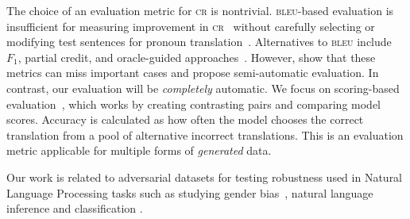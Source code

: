 The choice of an evaluation metric for \textsc{cr} is nontrivial. 
%
\textsc{bleu}-based evaluation is insufficient for measuring improvement in \textsc{cr}~\citep{hardmeier2012discourse} 
without carefully selecting or modifying test sentences for pronoun translation~\citep{voita2018anaphora,stojanovski-fraser-2018-coreference}.
%
Alternatives to \textsc{bleu} include $F_1$, partial credit, and oracle-guided approaches~\citep{hardmeier2010modelling,guillou-hardmeier-2016-protest,miculicich-werlen-popescu-belis-2017-validation}. 
%
However, \citet{guillou-hardmeier-2018-automatic} show that these metrics can miss important cases and propose semi-automatic evaluation. 
%
In contrast, our evaluation will be \textit{completely} automatic.  
%
We focus on scoring-based evaluation~\citep{sennrich-2017-grammatical}, which works by creating contrasting pairs and comparing model scores. 
%
Accuracy is calculated as how often the model chooses the correct translation from a pool of alternative incorrect translations.
%
This is an evaluation metric applicable for multiple forms of \textit{generated} \nlp{} data.

Our work is related to adversarial datasets for testing robustness used in  Natural Language Processing tasks such as  studying gender bias~\citep{zhao2018gender,rudinger2018gender,stanovsky-etal-2019-evaluating}, natural language inference \citep{glockner-etal-2018-breaking} and classification \citep{wang2019natural}.

